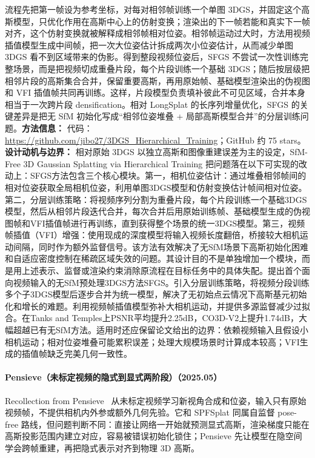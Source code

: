 流程先把第一帧设为参考坐标，对每对相邻帧训练一个单图 3DGS，并固定这个高斯模型，只优化作用在高斯中心上的仿射变换；渲染出的下一帧若能和真实下一帧对齐，这个仿射变换就被解释成相邻帧相对位姿。相邻帧运动过大时，方法用视频插值模型生成中间帧，把一次大位姿估计拆成两次小位姿估计，从而减少单图 3DGS 看不到区域带来的伪影。得到整段视频位姿后，SFGS 不尝试一次性训练完整场景，而是把视频切成重叠片段，每个片段训练一个基础 3DGS；随后按层级把相邻片段的高斯集合合并，保留重要高斯，再用原始帧、基础模型渲染出的伪视图和 VFI 插值帧共同再训练。这样，片段模型负责填补彼此不可见区域，合并本身相当于一次跨片段 densification。相对 LongSplat 的长序列增量优化，SFGS 的关键差异是把无 SfM 初始化写成“相邻位姿堆叠 + 局部高斯模型合并”的分层训练问题。\textbf{方法信息：} 代码：\url{https://github.com/jibo27/3DGS_Hierarchical_Training}；GitHub 约 75 stars。
\textbf{设计动机与边界：} 相对原始 3DGS 以独立高斯和图像重建误差为主的设定，SfM-Free 3D Gaussian Splatting via Hierarchical Training 把问题落在以下可实现的改动上：SFGS方法包含三个核心模块。第一，相机位姿估计：通过堆叠相邻帧间的相对位姿获取全局相机位姿，利用单图3DGS模型和仿射变换估计帧间相对位姿。第二，分层训练策略：将视频序列分割为重叠片段，每个片段训练一个基础3DGS模型，然后从相邻片段迭代合并，每次合并后用原始训练帧、基础模型生成的伪视图帧和VFI插值帧进行再训练，直到获得整个场景的统一3DGS模型。第三，视频帧插值（VFI）增强：使用现成的深度模型将输入视频长度翻倍，桥接较大相机运动间隔，同时作为额外监督信号。该方法有效解决了无SfM场景下高斯初始化困难和自适应密度控制在稀疏区域失效的问题。其设计目的不是单独增加一个模块，而是用上述表示、监督或渲染约束消除原流程在目标任务中的具体失配。提出首个面向视频输入的无SfM预处理3DGS方法SFGS。引入分层训练策略，将视频分段训练多个子3DGS模型后逐步合并为统一模型，解决了无初始点云情况下高斯基元初始化和增长的难题。利用视频帧插值模型弥补大相机运动，并提供多源监督减少过拟合。在Tanks and Temples上PSNR平均提升2.25dB，CO3D-V2上提升1.74dB，大幅超越已有无SfM方法。适用时还应保留论文给出的边界：依赖视频输入且假设小相机运动；相对位姿堆叠可能累积误差；处理大规模场景时计算成本较高；VFI生成的插值帧缺乏完美几何一致性。
\paragraph{Pensieve（未标定视频的隐式到显式两阶段）（2025.05）}
Recollection from Pensieve~\cite{2505_13440} 从未标定视频学习新视角合成和位姿，输入只有原始视频帧，不提供相机内外参或额外几何先验。它和 SPFSplat 同属自监督 pose-free 路线，但问题判断不同：直接让网络一开始就预测显式高斯，渲染梯度只能在高斯投影范围内建立对应，容易被错误初始化锁住；Pensieve 先让模型在隐空间学会跨帧重建，再把隐式表示对齐到物理 3D 高斯。

